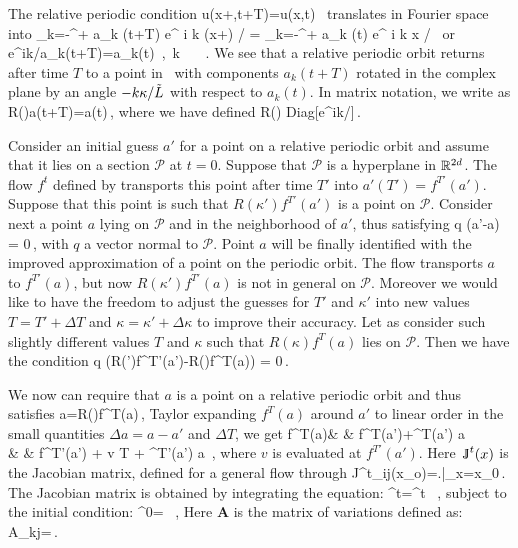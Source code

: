 The relative periodic condition
\beq
	u(x+\kappa,t+T)=u(x,t) \,
\eeq
translates in Fourier space into
\beq	
	\sum_{k=-\infty}^{+\infty} a_k (t+T) e^{ i k (x+\kappa) / \tildeL}
		= \sum_{k=-\infty}^{+\infty} a_k (t) e^{ i k x / \tildeL} \,
\eeq
or
\beq
	e^{ik\kappa/\tildeL}a_k(t+T)=a_k(t) \,,\ \forall k \in \integers
            \ \ \ .
	\label{eq:RPOcondition}
\eeq
We see that a relative periodic orbit returns after time $T$ to a point in
\statesp\ with components $a_k(t+T)$ rotated in the complex plane by an
angle $-k\kappa/\tilde{L}$ with respect to $a_k(t)$.
In matrix notation, we write  as
\beq
	R(\kappa)a(t+T)=a(t)\,,
	\label{eq:RPO}
\eeq
where we have defined
\beq
	R(\kappa) \equiv Diag[e^{ik\kappa/\tildeL}]\,.
\eeq

Consider an initial guess $a'$ for a point on a relative periodic orbit and assume that it lies on
a \Poincare section $\mathcal{P}$ at $t=0$. Suppose that $\mathcal{P}$ is a hyperplane in
$\mathbb{R}^{2d}$. The flow $f^t$ defined by  transports
this point after time $T'$ into $a'(T')=f^{T'}(a')$. Suppose that this point is such that $R(\kappa')f^{T'}(a')$
is a point on $\mathcal{P}$. Consider next a point $a$ lying on $\mathcal{P}$ and in the neighborhood of $a'$,
thus satisfying
\beq
	q \cdot (a'-a) = 0\,,
	\label{eq:cond a}
\eeq
with $q$ a vector normal to $\mathcal{P}$. Point $a$ will be finally identified with the improved
approximation of a point on the periodic orbit.
The flow transports $a$ to $f^{T'}(a)$, but now $R(\kappa')f^{T'}(a)$ is not in general on $\mathcal{P}$.
Moreover we would like to have the freedom to adjust the guesses for $T'$ and $\kappa'$ into new values
$T=T'+\Delta T$ and $\kappa=\kappa'+\Delta \kappa$ to improve their accuracy.
Let as consider such slightly different values $T$ and $\kappa$ such that $R(\kappa)f^{T}(a)$ lies on
$\mathcal{P}$. Then we have the condition
\beq
	q \cdot(R(\kappa')f^{T'}(a')-R(\kappa)f^{T}(a)) = 0\,.
	\label{eq:cond Rf(a)}
\eeq

 We now can require that $a$ is a point on a relative periodic orbit and thus satisfies 
\beq
	a=R(\kappa)f^{T}(a)\,,
	\label{eq:RPOcond}
\eeq
Taylor expanding $f^{T}(a)$ around $a'$ to linear order in the small quantities
$\Delta a=a-a'$ and $\Delta T$, we get
\bea
	f^{T}(a)& \simeq & f^{T}(a')+\J^T(a') \Delta a \label{eq:fTaylorl1} \\
		& \simeq & f^{T'}(a') + v \Delta T + \J^{T'}(a') \Delta a \label{eq:fTaylorl2} \,,
\eea
where $v$ is evaluated at $f^{T'}(a')$. Here $\J^t(x)$ is the Jacobian matrix, defined for a general flow through
\beq
   	J^t_{ij}(x_o)=\left.\right|_{x=x_0}\,.
\eeq
The Jacobian matrix is obtained by integrating the equation:
\beq
   	^t=^t \, ,
	\label{eq:Adef}
\eeq
subject to the initial condition:
\beq
   	^0= \, ,
\eeq
Here $\mathbf{A}$ is the matrix of variations defined as:
\beq
	A_{kj}=\,.
\eeq

